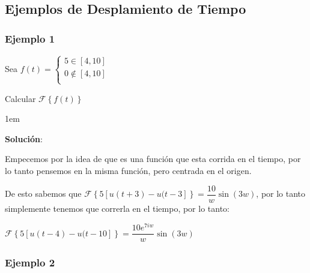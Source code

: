 \documentclass[12pt, fleqn]{report}                             %
\newenvironment{SmallIndentation}[1][0.75em]                    %
        {\begin{adjustwidth}{#1}{}\begin{footnotesize}}             %
        {\end{footnotesize}\end{adjustwidth}}                       %
\theoremstyle{break}                                            %
\newcommand{\Wrap}[1]           {\left( #1 \right)}             %
\newcommand{\Sin}[1] {\sin\Wrap{#1}}                            %
\newcommand{\FourierT}[1]   {\mathscr{F} \left\{ #1 \right\} }  %
\begin{document}
                \clearpage
                \subsection{Ejemplos de Desplamiento de Tiempo}

                    \subsubsection{Ejemplo 1}

                        Sea $f(t) = \begin{cases}
                                        5 \in [4, 10]       \\
                                        0 \notin [4, 10]    \\
                                    \end{cases}$

                        Calcular $\FourierT{f(t)}$

                        \begin{SmallIndentation}[1em]
                            \textbf{Solución}:

                            Empecemos por la idea de que es una función que esta corrida en el tiempo, por lo tanto
                            pensemos en la misma función, pero centrada en el origen.

                            De esto sabemos que $\FourierT{5[u(t+3) - u(t-3]} = \dfrac{10}{w} \Sin{3w}$, por lo 
                            tanto simplemente tenemos que correrla en el tiempo, por lo tanto:

                            $\FourierT{5[u(t-4) - u(t-10]} = \dfrac{10e^{7iw}}{w} \Sin{3w}$

                        \end{SmallIndentation}


                    \subsubsection{Ejemplo 2}
\end{document}
